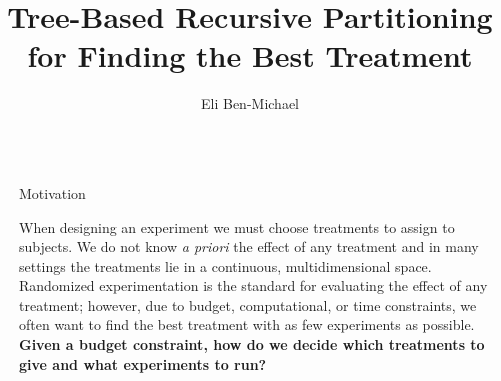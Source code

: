 \documentclass[final]{beamer}
\title{Tree-Based Recursive Partitioning for Finding the Best Treatment} %
\author{Eli Ben-Michael} %
\institute{Department of Statistics, UC Berkeley} %
\newlength{\sepwid}
\newlength{\onecolwid}
\begin{document}

\setlength{\belowcaptionskip}{2ex} %
\setlength\belowdisplayshortskip{2ex} %

\begin{frame}[t] %



\begin{columns}[t] %

\begin{column}{\sepwid}\end{column} %

\begin{column}{\onecolwid} %






\begin{block}{Motivation}

When designing an experiment we must choose treatments to assign to subjects. 
We do not know {\it a priori} the effect of any treatment and in many settings the treatments lie in a continuous, multidimensional space. Randomized experimentation is the standard for evaluating the effect of any treatment; however, due to budget, computational, or time constraints, we often want to find the best treatment with as few experiments as possible. {\bf Given a budget constraint, how do we decide which treatments to give and what experiments to run?}


\end{block}
\end{column}
\end{columns}
\end{frame}
\end{document}
